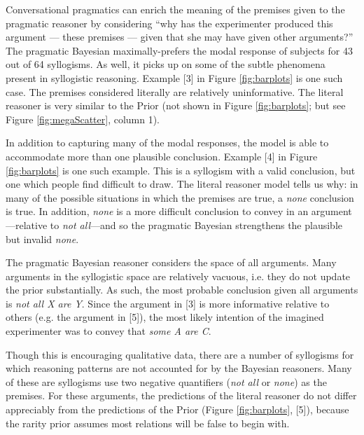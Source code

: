 \documentclass[10pt,letterpaper]{article}
\begin{document}
%


Conversational pragmatics can enrich the meaning of the premises given to the pragmatic reasoner by considering ``why has the experimenter produced this argument --- these premises --- given that she may have given other arguments?'' 
The pragmatic Bayesian maximally-prefers the modal response of subjects for 43 out of 64 syllogisms. As well, it picks up on some of the subtle phenomena present in syllogistic reasoning. Example [3] in Figure \ref{fig:barplots} is one such case. The premises considered literally are relatively uninformative. The literal reasoner is very similar to the Prior (not shown in Figure \ref{fig:barplots}; but see Figure \ref{fig:megaScatter}, column 1). 

In addition to capturing many of the modal responses, the model is able to accommodate more than one plausible conclusion. Example [4] in Figure \ref{fig:barplots} is one such example. This is a syllogism with a valid conclusion, but one which people find difficult to draw. The literal reasoner model tells us why: in many of the possible situations in which the premises are true, a \emph{none} conclusion is true. In addition, \emph{none} is a more difficult conclusion to convey in an argument---relative to \emph{not all}---and so the pragmatic Bayesian strengthens the plausible but invalid \emph{none}.


The pragmatic Bayesian reasoner considers the space of all arguments. Many arguments in the syllogistic space are relatively vacuous, i.e. they do not update the prior substantially. As such, the most probable conclusion given all arguments is  \emph{not all X are Y}. Since the argument in [3] is more informative relative to others (e.g. the argument in [5]), the most likely intention of the imagined experimenter was to convey that \emph{some A are C}.

Though this is encouraging qualitative data, there are a number of syllogisms for which reasoning patterns are not accounted for by the Bayesian reasoners. Many of these are syllogisms use two negative quantifiers (\emph{not all} or \emph{none}) as the premises. For these arguments, the predictions of the literal reasoner do not differ appreciably from the predictions of the Prior (Figure \ref{fig:barplots}, [5]), because the rarity prior assumes most relations will be false to begin with. 
\end{document}
